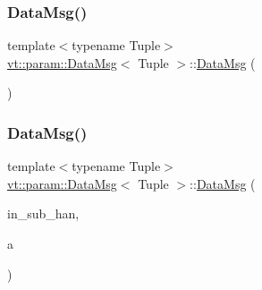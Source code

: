 \subsubsection{\texorpdfstring{Data\+Msg()}{DataMsg()}\hspace{0.1cm}{\footnotesize\ttfamily [1/3]}}
{\footnotesize\ttfamily template$<$typename Tuple$>$ \\
\hyperlink{structvt_1_1param_1_1_data_msg}{vt\+::param\+::\+Data\+Msg}$<$ Tuple $>$\+::\hyperlink{structvt_1_1param_1_1_data_msg}{Data\+Msg} (\begin{DoxyParamCaption}{ }\end{DoxyParamCaption})\hspace{0.3cm}{\ttfamily [default]}}

\mbox{\label{structvt_1_1param_1_1_data_msg_a9aa000cf8ea52f4b3e281153e8e94fe8}} 
\subsubsection{\texorpdfstring{Data\+Msg()}{DataMsg()}\hspace{0.1cm}{\footnotesize\ttfamily [2/3]}}
{\footnotesize\ttfamily template$<$typename Tuple$>$ \\
\hyperlink{structvt_1_1param_1_1_data_msg}{vt\+::param\+::\+Data\+Msg}$<$ Tuple $>$\+::\hyperlink{structvt_1_1param_1_1_data_msg}{Data\+Msg} (\begin{DoxyParamCaption}\item[{\hyperlink{namespacevt_af64846b57dfcaf104da3ef6967917573}{Handler\+Type} const \&}]{in\+\_\+sub\+\_\+han,  }\item[{Tuple \&\&}]{a }\end{DoxyParamCaption})\hspace{0.3cm}{\ttfamily [inline]}}

\mbox{\label{structvt_1_1param_1_1_data_msg_aae3d76ec2fbfda18cb8131cb41444e76}} 
